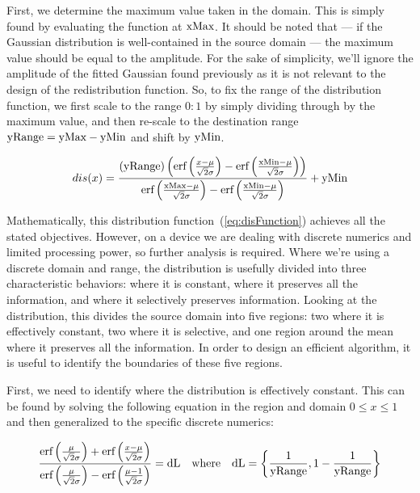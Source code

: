 First, we determine the maximum value taken in the domain. This is simply found by evaluating the function at $\text{xMax}$. It should be noted that --- if the Gaussian distribution is well-contained in the source domain --- the maximum value should be equal to the amplitude. For the sake of simplicity, we'll ignore the amplitude of the fitted Gaussian found previously as it is not relevant to the design of the redistribution function. So, to fix the range of the distribution function, we first scale to the range $0:1$ by simply dividing through by the maximum value, and then re-scale to the destination range $\text{yRange} = \text{yMax} - \text{yMin}$ and shift by $\text{yMin}$.

\begin{equation}\label{eq:disFunction}
  dis(x) = \frac{(\text{yRange}) \left(\text{erf}\left(\frac{x-\mu }{\sqrt{2} \sigma }\right)-\text{erf}\left(\frac{\text{xMin}-\mu }{\sqrt{2} \sigma }\right)\right)}{\text{erf}\left(\frac{\text{xMax}-\mu }{\sqrt{2} \sigma }\right)-\text{erf}\left(\frac{\text{xMin}-\mu }{\sqrt{2} \sigma }\right)}+\text{yMin}
\end{equation}

Mathematically, this distribution function~(\ref{eq:disFunction}) achieves all the stated objectives. However, on a device we are dealing with discrete numerics and limited processing power, so further analysis is required. Where we're using a discrete domain and range, the distribution is usefully divided into three characteristic behaviors:  where it is constant, where it preserves all the information, and where it selectively preserves information. Looking at the distribution, this divides the source domain into five regions: two where it is effectively constant, two where it is selective, and one region around the mean where it preserves all the information. In order to design an efficient algorithm, it is useful to identify the boundaries of these five regions.

First, we need to identify where the distribution is effectively constant. This can be found by solving the following equation in the region and domain $0 \le x \le 1$ and then generalized to the specific discrete numerics:

\begin{equation}\label{eq:0to1}
 \frac{\text{erf}\left(\frac{\mu }{\sqrt{2} \sigma }\right)+\text{erf}\left(\frac{x-\mu }{\sqrt{2} \sigma }\right)}{\text{erf}\left(\frac{\mu }{\sqrt{2} \sigma }\right)-\text{erf}\left(\frac{\mu -1}{\sqrt{2} \sigma }\right)}=\text{dL} \quad \text{where} \quad \text{dL} = \left\{ \frac{1}{\text{yRange}}, 1 - \frac{1}{\text{yRange}} \right\}
\end{equation}


